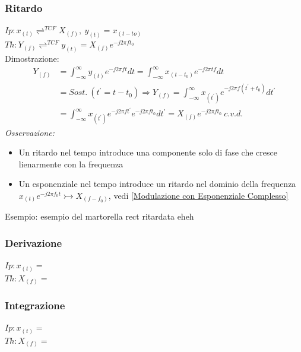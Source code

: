         \subsubsection{Ritardo}\label{Ritardo}
            $Ip: x_{(t)} \rightleftharpoons^{TCF} X_{(f)},\ y_{(t)} = x_{(t-to)}$\\        
            $Th: Y_{(f)} \rightleftharpoons^{TCF} y_{(t)} = X_{(f)}e^{-j2\pi ft_0}$\\ 
            Dimostrazione:
            \begin{align}
                Y_{(f)} & = \int_{-\infty}^{\infty} y_{(t)} e^{-j2\pi ft} dt = \int_{-\infty}^{\infty} x_{(t-t_0)} e^{-j2\pi tf} dt \nonumber \\
                        & =Sost.\ (t^\prime = t-t_0) \Rightarrow  Y_{(f)} = \int_{-\infty}^{\infty} x_{(t^\prime)} e^{-j2\pi f(t^\prime+t_0)} dt^\prime \nonumber \\
                        & =\int_{-\infty}^{\infty} x_{(t^\prime)} e^{-j2\pi ft^\prime}e^{-j2\pi ft_0} dt^\prime= X_{(f)}e^{-j2\pi ft_0}\ c.v.d.  \nonumber
            \end{align}
            {\em Osservazione:}
                \begin{itemize}
                    \item Un ritardo nel tempo introduce una componente solo di fase che cresce lienarmente con la frequenza
                    \item Un esponenziale nel tempo introduce un ritardo nel dominio della frequenza $x_{(t)}e^{-j2\pi f_0t} \rightarrowtail X_{(f-f_0)}$, vedi \ref{Modulazione con Esponenziale Complesso}
                \end{itemize}
            Esempio:
                {
                    esempio del martorella rect ritardata eheh
                }

        \subsubsection{Derivazione}\label{Derivazione}
            $Ip: x_{(t)} = $\\        
            $Th: X_{(f)} = $ 
            
        \subsubsection{Integrazione}\label{Integrazione}
            $Ip: x_{(t)} = $\\        
            $Th: X_{(f)} = $ 
        
